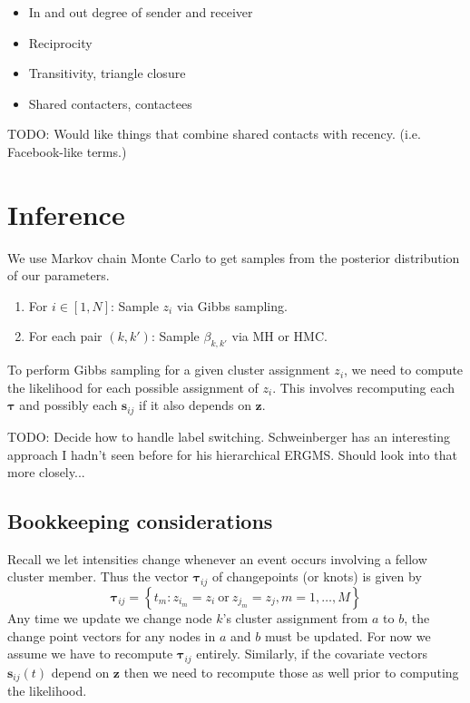 \documentclass[11pt]{article}
\begin{document}
\begin{itemize}
\item In and out degree of sender and receiver
\item Reciprocity
\item Transitivity, triangle closure
\item Shared contacters, contactees
\end{itemize}

TODO: Would like things that combine shared contacts with recency. (i.e. Facebook-like terms.) 

\section{Inference}

We use Markov chain Monte Carlo to get samples from the posterior distribution of our parameters.  

\begin{enumerate}
\item For $i \in [1,N]$: Sample $z_i$ via Gibbs sampling.
\item For each pair $(k,k')$: Sample $\beta_{k,k'}$ via MH or HMC.
\end{enumerate}

To perform Gibbs sampling for a given cluster assignment $z_i$, we need to compute the likelihood for each possible assignment of $z_i$.  This involves recomputing each $\boldsymbol{\tau}$ and possibly each $\mathbf{s}_{ij}$ if it also depends on $\mathbf{z}$.

TODO: Decide how to handle label switching.  Schweinberger has an interesting approach I hadn't seen before for his hierarchical ERGMS.  Should look into that more closely...

\subsection*{Bookkeeping considerations}

Recall we let intensities change whenever an event occurs involving a fellow cluster member.  Thus the vector $\boldsymbol{\tau}_{ij}$ of changepoints (or knots) is given by
$$\boldsymbol{\tau}_{ij} = \left\{ t_m: z_{i_m} = z_i \ \mbox{or} \ z_{j_m} = z_j, m=1,\ldots,M\right\}$$
Any time we update we change node $k$'s cluster assignment from $a$ to $b$, the change point vectors for any nodes in $a$ and $b$ must be updated.  For now we assume we have to recompute  $\boldsymbol{\tau}_{ij}$  entirely.  Similarly, if the covariate vectors $\mathbf{s}_{ij}(t)$ depend on $\mathbf{z}$ then we need to recompute those as well prior to computing the likelihood.%
\end{document}
